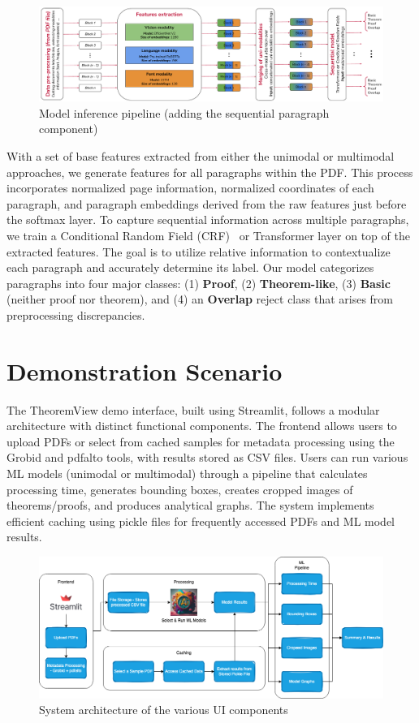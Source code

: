 \documentclass[runningheads]{llncs}
\begin{document}
\begin{figure}
	\centering
	\includegraphics[width=\textwidth]{images/general_pipeline.pdf}
	\caption{Model inference pipeline (adding the sequential paragraph component)}
	\label{fig:generalpipeline}
\end{figure}


With a set of base features extracted from either the unimodal or multimodal approaches, we generate
features for all paragraphs within the PDF. This process incorporates normalized page information,
normalized coordinates of each paragraph, and paragraph embeddings derived from the raw features
just before the softmax layer. To capture sequential information across multiple paragraphs, we train a
Conditional Random Field (CRF)~\cite{CRF2001Lafferty} or Transformer layer on top of the extracted features. The goal is to utilize
relative information to contextualize each paragraph and accurately determine its label. Our model
categorizes paragraphs into four major classes: (1) \textbf{Proof}, (2) \textbf{Theorem-like}, (3) \textbf{Basic} (neither
proof nor theorem), and (4) an \textbf{Overlap} reject class that arises from preprocessing discrepancies.

\section{Demonstration Scenario}

The TheoremView demo interface, built using Streamlit, follows a modular
architecture with distinct functional components. The frontend allows
users to upload PDFs or select from cached samples for metadata
processing using the Grobid and pdfalto tools, with results stored as CSV files. Users can run various ML models (unimodal or multimodal) through a pipeline that calculates processing time, generates bounding boxes, creates cropped images of theorems/proofs, and produces analytical graphs. The system implements efficient caching using pickle files for frequently accessed PDFs and ML model results.

\begin{figure}
	\centering
	\includegraphics[width=\textwidth]{images/sys-demo-arch.png}
	\caption{System architecture of the various UI components}
	\label{fig:system-arch}
\end{figure}
\end{document}
